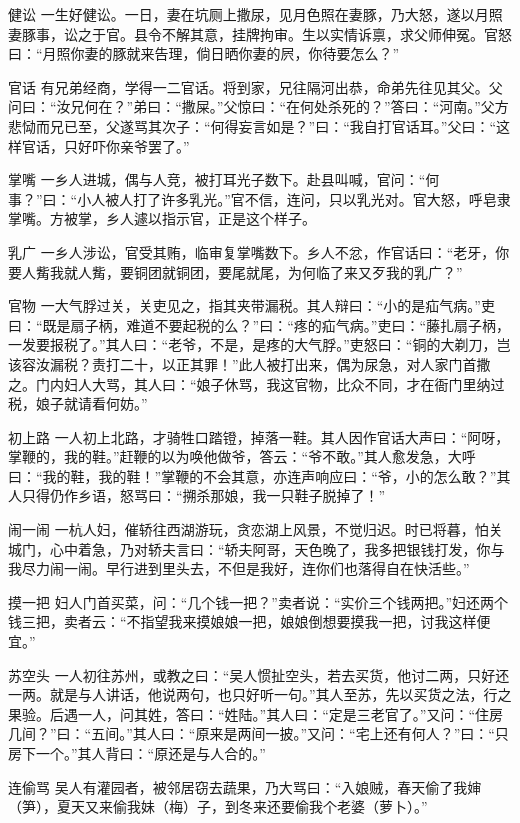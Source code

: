 \documentclass[12pt,UTF8]{ctexbook}
\begin{document}
健讼
一生好健讼。一日，妻在坑厕上撒尿，见月色照在妻豚，乃大怒，遂以月照妻豚事，讼之于官。县令不解其意，挂牌拘审。生以实情诉禀，求父师伸冤。官怒曰：“月照你妻的豚就来告理，倘日晒你妻的屄，你待要怎么？”

官话
有兄弟经商，学得一二官话。将到家，兄往隔河出恭，命弟先往见其父。父问曰：“汝兄何在？”弟曰：“撒屎。”父惊曰：“在何处杀死的？”答曰：“河南。”父方悲恸而兄已至，父遂骂其次子：“何得妄言如是？”曰：“我自打官话耳。”父曰：“这样官话，只好吓你亲爷罢了。”

掌嘴
一乡人进城，偶与人竞，被打耳光子数下。赴县叫喊，官问：“何事？”曰：“小人被人打了许多乳光。”官不信，连问，只以乳光对。官大怒，呼皂隶掌嘴。方被掌，乡人遽以指示官，正是这个样子。

乳广
一乡人涉讼，官受其贿，临审复掌嘴数下。乡人不忿，作官话曰：“老牙，你要人觜我就人觜，要铜团就铜团，要尾就尾，为何临了来又歹我的乳广？”

官物
一大气脬过关，关吏见之，指其夹带漏税。其人辩曰：“小的是疝气病。”吏曰：“既是扇子柄，难道不要起税的么？”曰：“疼的疝气病。”吏曰：“藤扎扇子柄，一发要报税了。”其人曰：“老爷，不是，是疼的大气脬。”吏怒曰：“铜的大剃刀，岂该容汝漏税？责打二十，以正其罪！”此人被打出来，偶为尿急，对人家门首撒之。门内妇人大骂，其人曰：“娘子休骂，我这官物，比众不同，才在衙门里纳过税，娘子就请看何妨。”

初上路
一人初上北路，才骑牲口踏镫，掉落一鞋。其人因作官话大声曰：“阿呀，掌鞭的，我的鞋。”赶鞭的以为唤他做爷，答云：“爷不敢。”其人愈发急，大呼曰：“我的鞋，我的鞋！”掌鞭的不会其意，亦连声响应曰：“爷，小的怎么敢？”其人只得仍作乡语，怒骂曰：“搠杀那娘，我一只鞋子脱掉了！”

闹一闹
一杭人妇，催轿往西湖游玩，贪恋湖上风景，不觉归迟。时已将暮，怕关城门，心中着急，乃对轿夫言曰：“轿夫阿哥，天色晚了，我多把银钱打发，你与我尽力闹一闹。早行进到里头去，不但是我好，连你们也落得自在快活些。”

摸一把
妇人门首买菜，问：“几个钱一把？”卖者说：“实价三个钱两把。”妇还两个钱三把，卖者云：“不指望我来摸娘娘一把，娘娘倒想要摸我一把，讨我这样便宜。”

苏空头
一人初往苏州，或教之曰：“吴人惯扯空头，若去买货，他讨二两，只好还一两。就是与人讲话，他说两句，也只好听一句。”其人至苏，先以买货之法，行之果验。后遇一人，问其姓，答曰：“姓陆。”其人曰：“定是三老官了。”又问：“住房几间？”曰：“五间。”其人曰：“原来是两间一披。”又问：“宅上还有何人？”曰：“只房下一个。”其人背曰：“原还是与人合的。”

连偷骂
吴人有灌园者，被邻居窃去蔬果，乃大骂曰：“入娘贼，春天偷了我婶（笋），夏天又来偷我妹（梅）子，到冬来还要偷我个老婆（萝卜）。”
\end{document}
